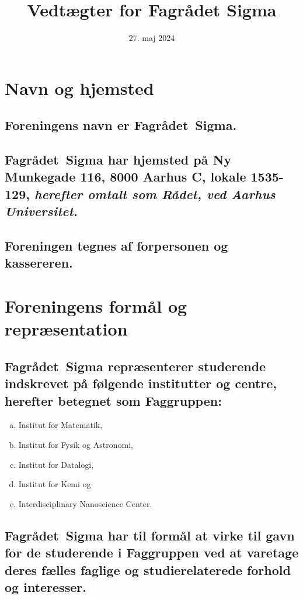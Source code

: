 \documentclass[10pt, danish]{article}
\title{Vedtægter for Fagrådet Sigma}
\date{27. maj 2024}
\author{}
\newcommand{\fagr}{Fagrådet~Sigma}
\begin{document}
	\maketitle
	
	\sffamily
	
	\section{Navn og hjemsted}\label{navn}
	
	\subsection{Foreningens navn er \fagr{}.}\label{navn:navn}
	
	\subsection{\fagr{} har hjemsted på Ny Munkegade 116, 8000 Aarhus C, lokale 1535-129, \emph{herefter omtalt som Rådet, ved Aarhus Universitet.}}
	
	\subsection{Foreningen tegnes af forpersonen og kassereren.}
	
	\section{Foreningens formål og repræsentation}\label{formaal}
	
	\subsection{\fagr{} repræsenterer studerende indskrevet på følgende institutter og centre, herefter betegnet som Faggruppen:}
	
	\begin{enumerate}[a), nosep]
		\item Institut for Matematik,
		\item Institut for Fysik og Astronomi,
		\item Institut for Datalogi,
		\item Institut for Kemi og
		\item Interdisciplinary Nanoscience Center.
	\end{enumerate}
	
	\subsection{\fagr{} har til formål at virke til gavn for de studerende i Faggruppen ved at varetage deres fælles faglige og studierelaterede forhold og interesser.}\label{formaal:gavn}
	
\end{document}

